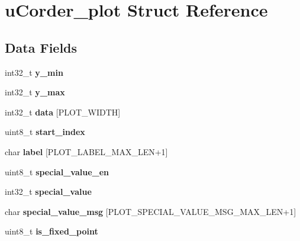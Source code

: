\hypertarget{structuCorder__plot}{}\section{u\+Corder\+\_\+plot Struct Reference}
\label{structuCorder__plot}
\subsection*{Data Fields}
\begin{DoxyCompactItemize}
\item 
int32\+\_\+t {\bfseries y\+\_\+min}\hypertarget{structuCorder__plot_aae1a5fa07c39489be789419a6af21a9f}{}\label{structuCorder__plot_aae1a5fa07c39489be789419a6af21a9f}

\item 
int32\+\_\+t {\bfseries y\+\_\+max}\hypertarget{structuCorder__plot_acec39cd0622e5cd98445036ca9f0ff10}{}\label{structuCorder__plot_acec39cd0622e5cd98445036ca9f0ff10}

\item 
int32\+\_\+t {\bfseries data} \mbox{[}P\+L\+O\+T\+\_\+\+W\+I\+D\+TH\mbox{]}\hypertarget{structuCorder__plot_afcf0c27eb85cb070a1e7f700a194bc9a}{}\label{structuCorder__plot_afcf0c27eb85cb070a1e7f700a194bc9a}

\item 
uint8\+\_\+t {\bfseries start\+\_\+index}\hypertarget{structuCorder__plot_aa0f03e14034689bc17504814be34e587}{}\label{structuCorder__plot_aa0f03e14034689bc17504814be34e587}

\item 
char {\bfseries label} \mbox{[}P\+L\+O\+T\+\_\+\+L\+A\+B\+E\+L\+\_\+\+M\+A\+X\+\_\+\+L\+EN+1\mbox{]}\hypertarget{structuCorder__plot_a13119b44a9a3329503ef42f1d2c1e561}{}\label{structuCorder__plot_a13119b44a9a3329503ef42f1d2c1e561}

\item 
uint8\+\_\+t {\bfseries special\+\_\+value\+\_\+en}\hypertarget{structuCorder__plot_a3fe52054c7c8b1e41969a03ba602f097}{}\label{structuCorder__plot_a3fe52054c7c8b1e41969a03ba602f097}

\item 
int32\+\_\+t {\bfseries special\+\_\+value}\hypertarget{structuCorder__plot_aa4b62079041f14ea8082d80ad38764cd}{}\label{structuCorder__plot_aa4b62079041f14ea8082d80ad38764cd}

\item 
char {\bfseries special\+\_\+value\+\_\+msg} \mbox{[}P\+L\+O\+T\+\_\+\+S\+P\+E\+C\+I\+A\+L\+\_\+\+V\+A\+L\+U\+E\+\_\+\+M\+S\+G\+\_\+\+M\+A\+X\+\_\+\+L\+EN+1\mbox{]}\hypertarget{structuCorder__plot_a79bdf22868124a1e2e7961984e79b8be}{}\label{structuCorder__plot_a79bdf22868124a1e2e7961984e79b8be}

\item 
uint8\+\_\+t {\bfseries is\+\_\+fixed\+\_\+point}\hypertarget{structuCorder__plot_a13227dff4fd804415295f3b01f453d8a}{}\label{structuCorder__plot_a13227dff4fd804415295f3b01f453d8a}

\end{DoxyCompactItemize}


